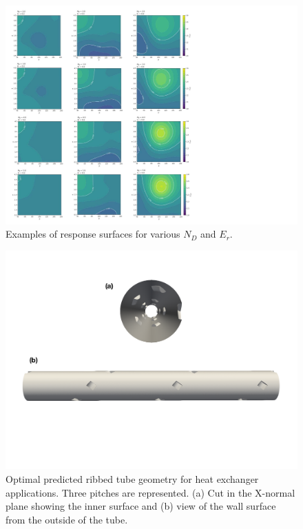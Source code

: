 \begin{figure}[h!]
\centering
\includegraphics[width=\linewidth,keepaspectratio]{fig/applications/optim/GP_discontinu_red.pdf}
\caption{Examples of response surfaces for various $N_D$ and $E_r$.}
\label{total_RS}
\end{figure}

\begin{figure}[!h]
\centering
\includegraphics[width=0.8\linewidth,keepaspectratio]{fig/applications/optim/geom_opt.pdf}
\caption{Optimal predicted ribbed tube geometry for heat exchanger applications. Three pitches are represented. (a) Cut in the X-normal plane showing the inner surface and (b) view of the wall surface from the outside of the tube.}
\label{geom_optim}
\end{figure}

